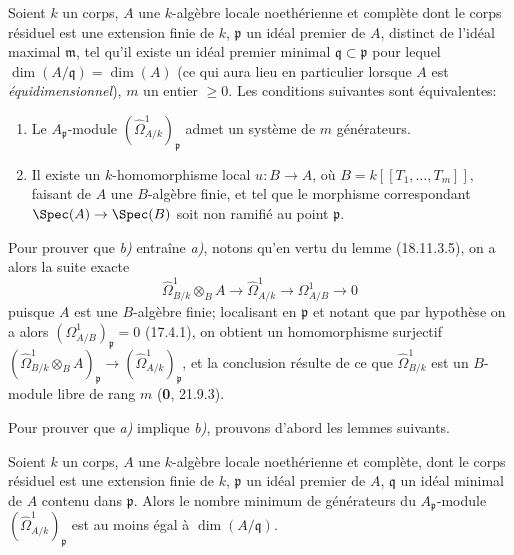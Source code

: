 \begin{proposition}[18.11.5]
\label{IV.18.11.5}
Soient $k$ un corps, $A$ une $k$-algèbre locale noethérienne et complète dont le corps résiduel est une extension finie de $k$, $\mathfrak p$ un idéal premier de $A$, distinct de l'idéal maximal $\mathfrak m$, tel qu'il existe un idéal premier minimal $\mathfrak q\subset\mathfrak p$ pour lequel $\dim(A/\mathfrak q)=\dim(A)$ \textup{(ce qui aura lieu en particulier lorsque $A$ est \emph{équidimensionnel})}, $m$ un entier $\geq0$. Les conditions suivantes sont équivalentes:
\begin{enumerate}
  \item[\textup{a)}] Le $A_{\mathfrak p}$-module $(\hat{\Omega}^1_{A/k})_{\mathfrak p}$ admet un système de $m$ générateurs.
  \item[\textup{b)}] Il existe un $k$-homomorphisme local $u:B\to A$, où $B=k[[T_1,\ldots,T_m]]$, faisant de $A$ une $B$-algèbre finie, et tel que le morphisme correspondant $\Spec(A)\to\Spec(B)$ soit non ramifié au point $\mathfrak p$.
\end{enumerate}
\end{proposition}

Pour prouver que \emph{b)} entraîne \emph{a)}, notons qu'en vertu du lemme (18.11.3.5), on a alors la suite exacte
\[
  \hat{\Omega}^1_{B/k}\otimes_B A\longrightarrow\hat{\Omega}^1_{A/k}\longrightarrow\Omega^1_{A/B}\longrightarrow0
\]
puisque $A$ est une $B$-algèbre finie; localisant en $\mathfrak p$ et notant que par hypothèse on a alors $(\Omega^1_{A/B})_{\mathfrak p}=0$ (17.4.1), on obtient un homomorphisme surjectif $(\hat{\Omega}^1_{B/k}\otimes_B A)_{\mathfrak p}\to(\hat{\Omega}^1_{A/k})_{\mathfrak p}$, et la conclusion résulte de ce que $\hat{\Omega}^1_{B/k}$ est un $B$-module libre de rang $m$ (\textbf{0}, 21.9.3).

Pour prouver que \emph{a)} implique \emph{b)}, prouvons d'abord les lemmes suivants.

\begin{lemma}[18.11.5.1]
\label{IV.18.11.5.1}
Soient $k$ un corps, $A$ une $k$-algèbre locale noethérienne et complète, dont le corps résiduel est une extension finie de $k$, $\mathfrak p$ un idéal premier de $A$, $\mathfrak q$ un idéal minimal de $A$ contenu dans $\mathfrak p$. Alors le nombre minimum de générateurs du $A_{\mathfrak p}$-module $(\hat{\Omega}^1_{A/k})_{\mathfrak p}$ est au moins égal à $\dim(A/\mathfrak q)$.
\end{lemma}


